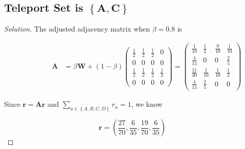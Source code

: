 \documentclass{article}
\newcommand{\set}[1]{\left\{#1\right\}}
\newenvironment{solution}{\begin{proof}[\noindent\it Solution]}{\end{proof}}
\newcommand{\bd}[1]{\boldsymbol{#1}}
\begin{document}
\vspace{1em}
\subsection{Teleport Set is $\set{\bd{A},\bd{C}}$}
\vspace{1em}
\begin{solution}
    The adjusted adjacency matrix when $\beta=0.8$ is 

    \vspace{-1.5em}
    \begin{align*}
        \qquad \qquad \bd{A} & = \beta \bd{W} + \left(1-\beta\right)\left(
            \begin{array}{cccc}
                \frac{1}{2} & \frac{1}{2} & \frac{1}{2} & 0 \\
                0 & 0 & 0 & 0 \\
                \frac{1}{2} & \frac{1}{2} & \frac{1}{2} & \frac{1}{2} \\
                0 & 0 & 0 & 0
            \end{array}
        \right) = \left(
            \begin{array}{cccc}
                \frac{1}{10} & \frac{1}{2} & \frac{9}{10} & \frac{1}{10} \\
                \frac{4}{15} & 0 & 0 & \frac{2}{5} \\
                \frac{11}{30} & \frac{1}{10} & \frac{1}{10} & \frac{1}{2} \\
                \frac{4}{15} & \frac{2}{5} & 0 & 0 
            \end{array}
        \right)
    \end{align*}

    \hspace{2.6em}
    Since $\bd{r}=\bd{A}\bd{r}$ and $\sum_{u\in\set{A,B,C,D}} r_u=1$, we know

    \vspace{-0.5em}
    $$\bd{r} = \left(
        \dfrac{27}{70}, \dfrac{6}{35}, \dfrac{19}{70}, \dfrac{6}{35}
    \right)$$

    \vspace{-2.75em}
\end{solution}

\vspace{1em}
\end{document}
